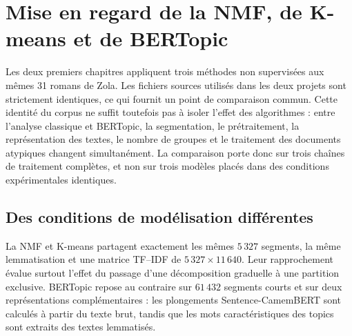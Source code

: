 \section{Mise en regard de la NMF, de K-means et de BERTopic}

Les deux premiers chapitres appliquent trois méthodes non supervisées aux mêmes 31 romans de Zola. Les fichiers sources utilisés dans les deux projets sont strictement identiques, ce qui fournit un point de comparaison commun. Cette identité du corpus ne suffit toutefois pas à isoler l'effet des algorithmes : entre l'analyse classique et BERTopic, la segmentation, le prétraitement, la représentation des textes, le nombre de groupes et le traitement des documents atypiques changent simultanément. La comparaison porte donc sur trois chaînes de traitement complètes, et non sur trois modèles placés dans des conditions expérimentales identiques.

\subsection{Des conditions de modélisation différentes}

La NMF et K-means partagent exactement les mêmes \(5\,327\) segments, la même lemmatisation et une matrice TF--IDF de \(5\,327 \times 11\,640\). Leur rapprochement évalue surtout l'effet du passage d'une décomposition graduelle à une partition exclusive. BERTopic repose au contraire sur \(61\,432\) segments courts et sur deux représentations complémentaires : les plongements Sentence-CamemBERT sont calculés à partir du texte brut, tandis que les mots caractéristiques des topics sont extraits des textes lemmatisés.

